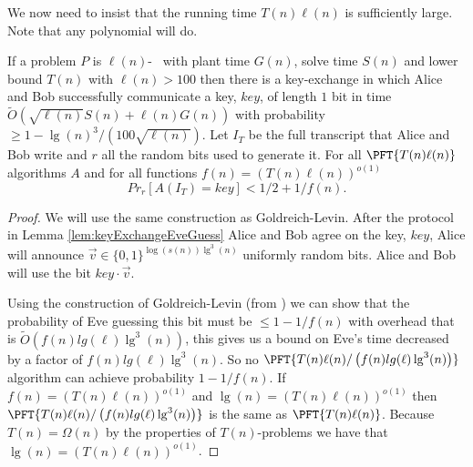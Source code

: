 We now need to insist that the running time $T(n)\ell(n)$ is sufficiently large. Note that any polynomial will do. 
\begin{lemma}
		If a problem $P$ is $\ell(n)$-\keyER~ with plant time $G(n)$, solve time $S(n)$ and lower bound $T(n)$  with $\ell(n)>100$
then there is a key-exchange in which Alice and Bob successfully communicate a key, $key$, of length $1$ bit in time $\tilde{O}(\sqrt{\ell(n)}S(n) + \ell(n)G(n))$ with probability $\geq 1-\lg(n)^3/(100 \sqrt{\ell(n)})$. Let $I_T$ be the full transcript that Alice and Bob write and $r$ all the random bits used to generate it. For all $\PFT{T(n)\ell(n)}$ algorithms $A$ and for all functions $f(n)=\left(T(n)\ell(n)\right)^{o(1)}$
$$Pr_{r}[A(I_T)=key]<1/2+1/f(n).$$
	\label{lem:keyExchangeHCBit}
\end{lemma}
\begin{proof}
We will use the same construction as Goldreich-Levin. After the protocol in Lemma \ref{lem:keyExchangeEveGuess} Alice and Bob agree on the key, $key$, Alice will announce $\vec{v}\in \{0,1\}^{\log(s(n))\lg^3(n)}$ uniformly random bits. Alice and Bob will use the bit $key \cdot \vec{v}$.

Using the construction of Goldreich-Levin (from \cite{hardCoreBitsAndXorLemmaFromGL}) we can show that the probability of Eve guessing this bit must be $\leq 1-1/f(n)$ with overhead that is $\tilde{O}(f(n)lg(\ell)\lg^3(n))$, this gives us a bound on Eve's time decreased by a factor of $f(n)lg(\ell)\lg^3(n)$. So no $\PFT{T(n)\ell(n)/\left( f(n)lg(\ell)\lg^3(n) \right)}$ algorithm can achieve probability $1-1/f(n)$. If  $f(n)=\left(T(n)\ell(n)\right)^{o(1)}$ and $\lg(n) = \left(T(n)\ell(n)\right)^{o(1)}$ then $\PFT{T(n)\ell(n)/\left( f(n)lg(\ell)\lg^3(n) \right)}$ is the same as $\PFT{T(n)\ell(n)}$. Because $T(n) = \Omega(n)$ by the properties of $T(n)$-\ACIH problems we have that $\lg(n) = \left(T(n)\ell(n)\right)^{o(1)}$. 
\end{proof}



